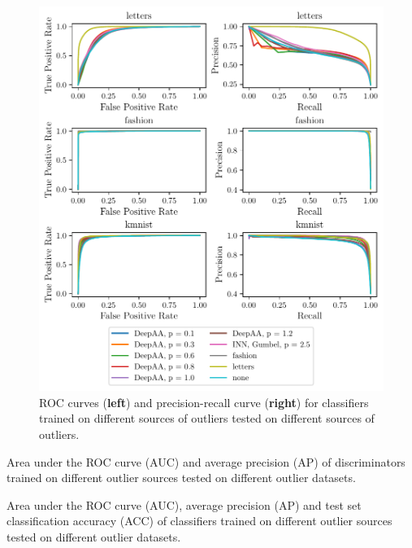 \begin{figure}[htpb]
    \centering
    \includegraphics{figures/samples/emnist_class_curve.pdf}
    \caption{ROC curves (\textbf{left}) and precision-recall curve (\textbf{right}) for
    classifiers trained on different sources of outliers tested on different
    sources of outliers.}%
    \label{fig:emnist_stat_class}
\end{figure}

\begin{table}[htpb]
	\centering
        \caption{Area under the ROC curve (AUC) and average precision (AP) of
        discriminators trained on different outlier sources tested on different
        outlier datasets.}%
	\label{tab:emnist_disc}
	
\end{table}

\begin{table}[htpb]
	\centering
        \caption{Area under the ROC curve (AUC), average precision (AP) and
        test set classification accuracy (ACC) of classifiers trained on
        different outlier sources tested on different outlier datasets.}%
	\label{tab:emnist_class}
	
\end{table}

